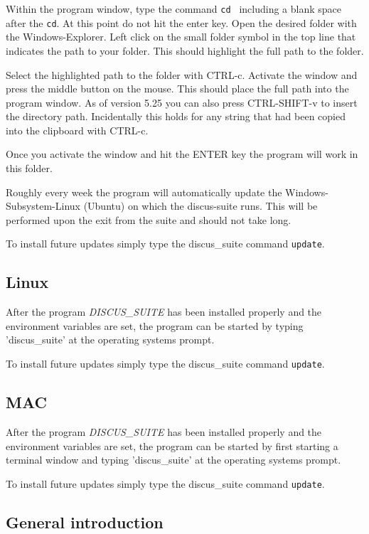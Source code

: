 Within the \Suite program window, type the command {\tt cd } including a
blank space after the {\tt cd}. At this point do not hit the enter key.
Open the desired folder with the Windows-Explorer. Left click on the
small folder symbol in the top line that indicates the path to your
folder. This should highlight the full path to the folder.

Select the highlighted path to the folder
with CTRL-c. Activate the \Suite window and press the
middle button on the mouse. This should place the full path into the
program window. As of version 5.25 you can also press CTRL-SHIFT-v to
insert the directory path. Incidentally this holds for any string that had
been copied into the clipboard with CTRL-c. 

Once you activate the window and hit the ENTER key the program will
work in this folder.

Roughly every week the program will automatically update the 
Windows-Subsystem-Linux (Ubuntu) on which the discus-suite runs. 
This will be performed upon the exit from the suite and should not take long.

To install future updates simply type the discus\_suite command {\tt update}.

\subsection{Linux}


After the program {\it DISCUS\_SUITE} has been installed properly and the
environment variables are set, the program can be started by typing
'discus\_suite' at the operating systems prompt.

To install future updates simply type the discus\_suite command {\tt update}.

\subsection{MAC}

After the program {\it DISCUS\_SUITE} has been installed properly and the
environment variables are set, the program can be started by first 
starting a terminal window and typing
'discus\_suite' at the operating systems prompt.

To install future updates simply type the discus\_suite command {\tt update}.

\subsection{General introduction}

